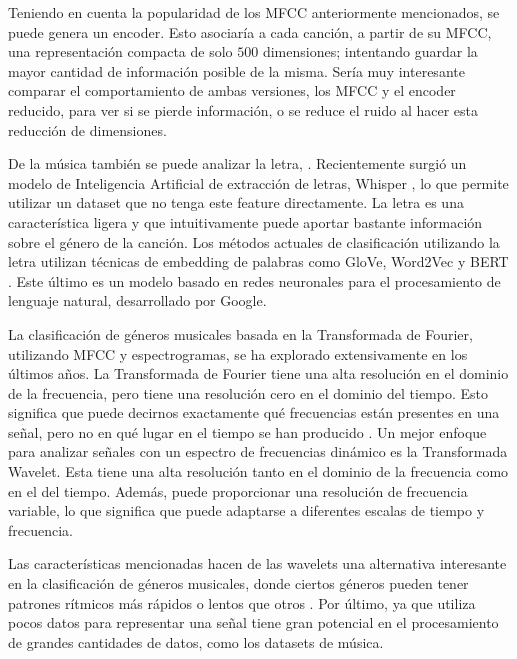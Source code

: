 \documentclass[colorinlistoftodos,twoside,twocolumn,10pt]{article} %
\begin{document}
Teniendo en cuenta la popularidad de los MFCC anteriormente mencionados, se puede genera un encoder. Esto asociar\'ia a cada canci\'on, a partir de su MFCC, una representaci\'on compacta de solo $500$ dimensiones; intentando guardar la mayor cantidad de informaci\'on posible de la misma. Sería muy interesante comparar el comportamiento de ambas versiones, los MFCC y el encoder reducido, para ver si se pierde informaci\'on, o se reduce el ruido al hacer esta reducci\'on de dimensiones. 

De la  m\'usica tambi\'en se puede analizar la letra, . Recientemente surgi\'o un modelo de Inteligencia Artificial de extracci\'on de letras, Whisper \cite{whisper}, lo que permite utilizar un dataset que no tenga este feature directamente. 
La letra es una caracter\'istica ligera y que intuitivamente puede aportar bastante informaci\'on sobre el g\'enero de la canci\'on. Los m\'etodos actuales de clasificaci\'on utilizando la letra utilizan técnicas de embedding de palabras como GloVe, Word2Vec\cite{classification with lyrics} y BERT \cite{bert}.  Este \'ultimo es un modelo basado en redes neuronales para el procesamiento de lenguaje natural, desarrollado por Google.

La clasificaci\'on de g\'eneros musicales basada en la Transformada de Fourier, utilizando MFCC y espectrogramas, se ha explorado extensivamente en los \'ultimos a\~nos. La Transformada de Fourier tiene una alta resoluci\'on en el dominio de la frecuencia, pero tiene una resoluci\'on cero en el dominio del tiempo. Esto significa que puede decirnos exactamente qu\'e frecuencias est\'an presentes en una se\~nal, pero no en qu\'e lugar en el tiempo se han producido \cite{wavelet transform in machine learning}.
Un mejor enfoque para analizar se\~nales con un espectro de frecuencias din\'amico es la Transformada Wavelet. Esta tiene una alta resoluci\'on tanto en el dominio de la frecuencia como en el del tiempo. Adem\'as, puede proporcionar una resoluci\'on de frecuencia variable, lo que significa que puede adaptarse a diferentes escalas de tiempo y frecuencia. 

Las caracter\'isticas mencionadas hacen de las wavelets una alternativa interesante  en la clasificaci\'on de g\'eneros musicales, donde ciertos g\'eneros pueden tener patrones r\'itmicos m\'as r\'apidos o lentos que otros \cite{Musical Genre Classification Of Audio Signals}. Por \'ultimo, ya que utiliza pocos datos para representar una se\~nal tiene gran potencial en el procesamiento de grandes cantidades de datos, como los datasets de m\'usica. 
\end{document}

